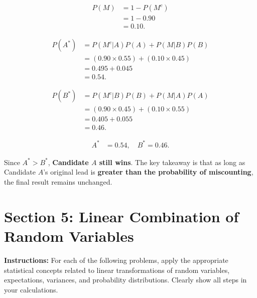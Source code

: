 \documentclass{article}
\begin{document}
\begin{enumerate}
{    \begin{align*}
    P(M) &= 1 - P(M^c) \\
    &= 1 - 0.90 \\
    &= 0.10.
    \end{align*}

    \begin{align*}
    P(A^*) &= P(M^c | A) P(A) + P(M | B) P(B) \\
    &= (0.90 \times 0.55) + (0.10 \times 0.45) \\
    &= 0.495 + 0.045 \\
    &= 0.54.
    \end{align*}

    \begin{align*}
    P(B^*) &= P(M^c | B) P(B) + P(M | A) P(A) \\
    &= (0.90 \times 0.45) + (0.10 \times 0.55) \\
    &= 0.405 + 0.055 \\
    &= 0.46.
    \end{align*}

    \begin{align*}
    A^* &= 0.54, \quad B^* = 0.46.
    \end{align*}

    Since \( A^* > B^* \), \textbf{Candidate \( A \) still wins}. The key takeaway is that as long as Candidate \( A \)'s original lead is \textbf{greater than the probability of miscounting}, the final result remains unchanged.
    }
\end{enumerate}


\newpage
\section*{Section 5: Linear Combination of Random Variables}

\noindent\textbf{Instructions:}
For each of the following problems, apply the appropriate statistical concepts related to linear transformations of random variables, expectations, variances, and probability distributions. Clearly show all steps in your calculations.
\end{document}
